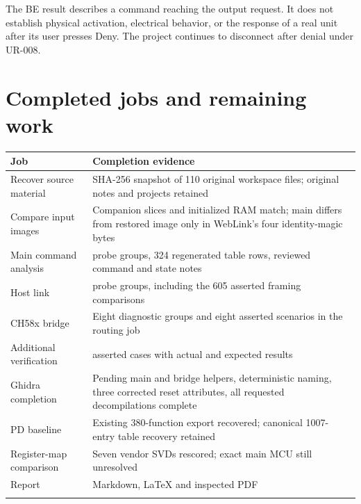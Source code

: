 The BE result describes a command reaching the output request. It does
not establish physical activation, electrical behavior, or the response
of a real unit after its user presses Deny. The project continues to
disconnect after denial under UR-008.

\section{Completed jobs and remaining
work}\label{completed-jobs-and-remaining-work}

{\def\LTcaptype{none} %
\begin{longtable}[]{@{}
  >{\raggedright\arraybackslash}p{}
  >{\raggedright\arraybackslash}p{}@{}}
\toprule\noalign{}
\begin{minipage}[b]{\linewidth}\raggedright
Job
\end{minipage} & \begin{minipage}[b]{\linewidth}\raggedright
Completion evidence
\end{minipage} \\
\midrule\noalign{}
\endhead
\bottomrule\noalign{}
\endlastfoot
Recover source material & SHA-256 snapshot of 110 original workspace
files; original notes and projects retained \\
Compare input images & Companion slices and initialized RAM match; main
differs from restored image only in WebLink's four identity-magic
bytes \\
Main command analysis & 12 probe groups, 324 regenerated table rows,
reviewed command and state notes \\
Host link & 12 probe groups, including the 605 asserted framing
comparisons \\
CH58x bridge & Eight diagnostic groups and eight asserted scenarios in
the routing job \\
Additional verification & 44 asserted cases with actual and expected
results \\
Ghidra completion & Pending main and bridge helpers, deterministic
naming, three corrected reset attributes, all requested decompilations
complete \\
PD baseline & Existing 380-function export recovered; canonical
1007-entry table recovery retained \\
Register-map comparison & Seven vendor SVDs rescored; exact main MCU
still unresolved \\
Report & Markdown, LaTeX and inspected PDF \\*
\end{longtable}
}

